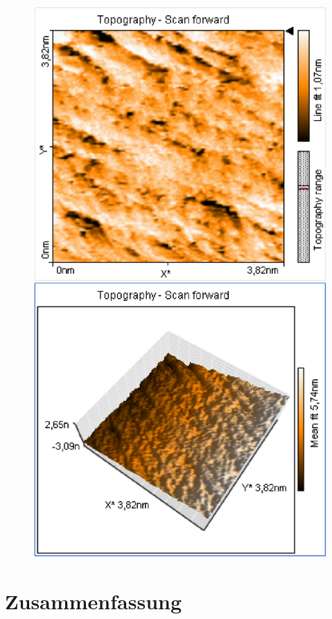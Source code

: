 \documentclass[12pt]{article}
\begin{document}
\begin{figure}[H]
\begin{minipage}{0.4\linewidth}
\includegraphics[width=0.9\linewidth]{../plot/data/mos2/mos29.eps}
\end{minipage}
\end{figure}

\section{Zusammenfassung}
\end{document}
